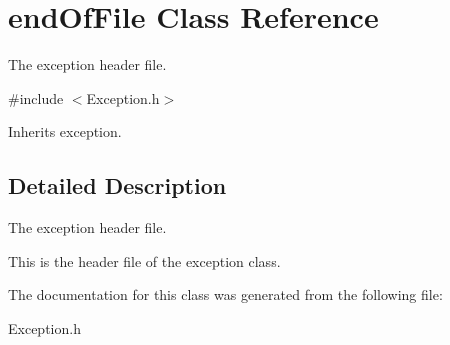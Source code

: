 \hypertarget{classend_of_file}{\section{end\+Of\+File Class Reference}
\label{classend_of_file}
}


The exception header file.  




{\ttfamily \#include $<$Exception.\+h$>$}



Inherits exception.



\subsection{Detailed Description}
The exception header file. 

This is the header file of the exception class. 

The documentation for this class was generated from the following file\+:\begin{DoxyCompactItemize}
\item 
Exception.\+h\end{DoxyCompactItemize}
